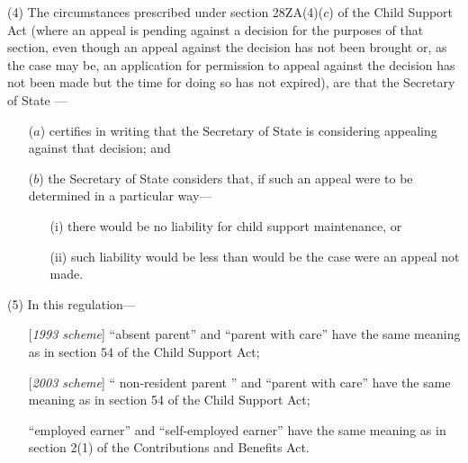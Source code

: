 \documentclass[12pt,a4paper]{article}
\begin{document}
(4) The circumstances prescribed under section 28ZA(4)($c$) of the Child Support Act (where an appeal is pending against a decision for the purposes of that section, even though an appeal against the decision has not been brought or, as the case may be, an application for 
permission  %
to appeal against the decision has not been made but the time for doing so has not expired), are that the 
Secretary of State%
—
\begin{enumerate}\item[]
($a$) certifies in writing that 
the Secretary of State  %
is considering appealing against that decision; and

($b$) 
the Secretary of State  %
considers that, if such an appeal were to be determined in a particular way—
\begin{enumerate}\item[]
(i) there would be no liability for child support maintenance, or

(ii) such liability would be less than would be the case were an appeal not made.
\end{enumerate}
\end{enumerate}

(5) In this regulation—
\begin{enumerate}\item[]
[\emph{1993 scheme}] “absent parent” and “parent with care” have the same meaning as in section 54 of the Child Support Act;

[\emph{2003 scheme}] “%
non-resident parent%
” and “parent with care” have the same meaning as in section 54 of the Child Support Act;

“employed earner” and “self-employed earner” have the same meaning as in section 2(1) of the Contributions and Benefits Act.
\end{enumerate}
\end{document}
